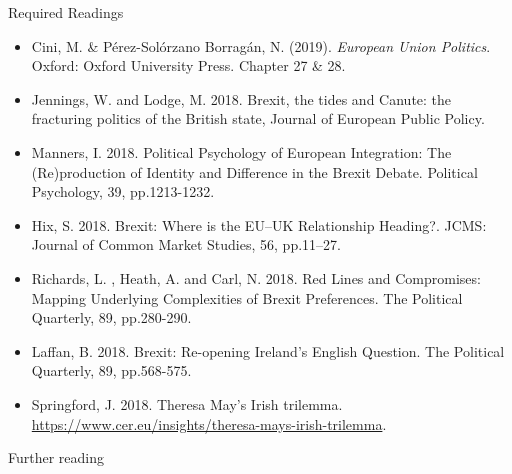 \noindent Required Readings

\begin{itemize}
	\item Cini, M. \& P\'{e}rez-Sol\'{o}rzano Borrag\'{a}n, N. (2019). \textit{European Union Politics}. Oxford: Oxford University Press. Chapter 27 \& 28.
	\item Jennings, W. and Lodge, M. 2018. Brexit, the tides and Canute: the fracturing politics of the British state, Journal of European Public Policy.
	\item Manners, I. 2018. Political Psychology of European Integration: The (Re)production of Identity and Difference in the Brexit Debate. Political Psychology, 39, pp.1213-1232.
	\item Hix, S. 2018. Brexit: Where is the EU–UK Relationship Heading?. JCMS: Journal of Common Market Studies, 56, pp.11–27.
	\item Richards, L. , Heath, A. and Carl, N. 2018. Red Lines and Compromises: Mapping Underlying Complexities of Brexit Preferences. The Political Quarterly, 89, pp.280-290.
	\item Laffan, B. 2018. Brexit: Re-opening Ireland's English Question. The Political Quarterly, 89, pp.568-575. 
	\item Springford, J. 2018. Theresa May's Irish trilemma. \url{https://www.cer.eu/insights/theresa-mays-irish-trilemma}.
\end{itemize}

\noindent Further reading

